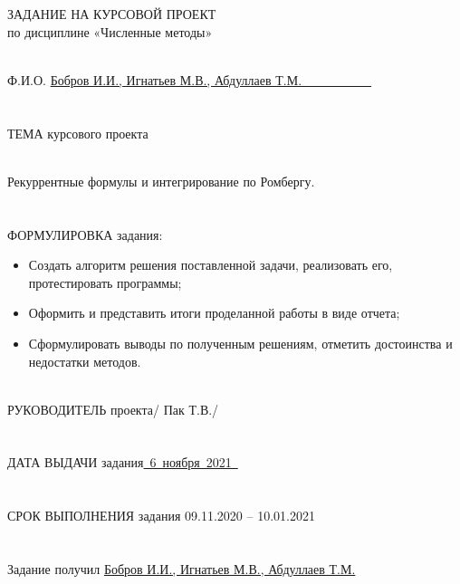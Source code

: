 \documentclass[14pt, titlepage, a4paper]{extarticle} %
\begin{document}
	
	
	\begin{center}
		ЗАДАНИЕ НА КУРСОВОЙ ПРОЕКТ\\
		по дисциплине «Численные методы»
	\end{center}
	
	~\\	
	Ф.И.О. \uline{\vspace{10pt} Бобров И.И., Игнатьев М.В., Абдуллаев Т.М.~~~~~~~~~~~}\\
	~\\
	~\\
	ТЕМА курсового проекта
	
	~\\
	Рекуррентные формулы и интегрирование по Ромбергу.
	\\
	~\\
	~\\
	ФОРМУЛИРОВКА  задания:
	
	\begin{itemize}
		\item Создать алгоритм решения поставленной задачи, реализовать его, протестировать программы;
		\item Оформить и представить итоги проделанной работы в виде отчета;
		\item Сформулировать выводы по полученным решениям, отметить достоинства и недостатки методов.
	\end{itemize}

	~\\
	РУКОВОДИТЕЛЬ проекта\uline{\hspace{80pt}}/ Пак Т.В./\\	
	\\
	~\\
	ДАТА ВЫДАЧИ задания\uline{~6~ноября~2021~}\\
	\\
	~\\
	СРОК ВЫПОЛНЕНИЯ задания 09.11.2020 – 10.01.2021\\
	\\
	~\\
	Задание получил \uline{Бобров И.И., Игнатьев М.В., Абдуллаев Т.М.}\\
	
	\thispagestyle{empty}
	\newpage
	
	
\end{document}
